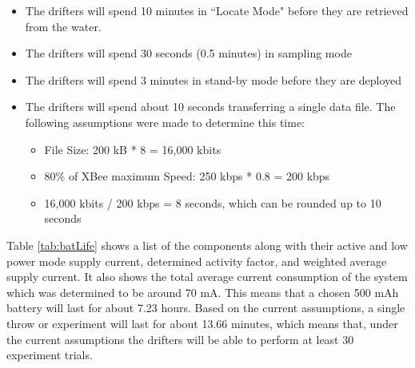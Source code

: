 \begin{itemize}
\item The drifters will spend 10 minutes in ``Locate Mode" before they are retrieved from the water.
\item The drifters will spend 30 seconds (0.5 minutes) in sampling mode
\item The drifters will spend 3 minutes in stand-by mode before they are deployed
\item The drifters will spend about 10 seconds transferring a single data file.  The following assumptions were made to determine this time:
	\begin{itemize}
		\item File Size: 200 kB * 8 = 16,000 kbits
		\item 80\% of XBee maximum Speed: 250 kbps * 0.8 = 200 kbps
		\item 16,000 kbits / 200 kbps = 8 seconds, which can be rounded up to 10 seconds
	\end{itemize}
\end{itemize}


Table \ref{tab:batLife} shows a list of the components along with their active and low power mode supply current, determined activity factor, and weighted average supply current.  It also shows the total average current consumption of the system which was determined to be  around 70 mA.  This means that a chosen 500 mAh battery will last for about 7.23 hours.  Based on the current assumptions, a single throw or experiment will last for about 13.66 minutes, which means that, under the current assumptions the drifters will be able to perform at least 30 experiment trials.


